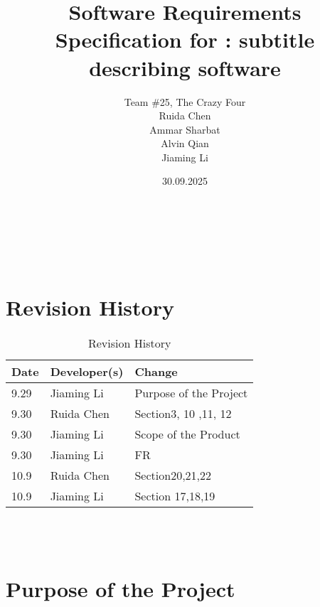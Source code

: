 \documentclass[12pt]{article}
\begin{document}
\title{Software Requirements Specification for \progname: subtitle describing software}
\author{
    Team \#25, The Crazy Four \\[1ex]
    Ruida Chen \\
    Ammar Sharbat \\
    Alvin Qian \\
    Jiaming Li
}
\date{30.09.2025}
    
\maketitle

~\newpage


\tableofcontents

~\newpage

\section*{Revision History}

\begin{table}[hp]
    \caption{Revision History} \label{TblRevisionHistory}
    \begin{tabularx}{\textwidth}{llX}
        \toprule
        \textbf{Date} & \textbf{Developer(s)} & \textbf{Change}\\
        \midrule
        9.29 & Jiaming Li & Purpose of the Project\\
        9.30 & Ruida Chen & Section3, 10 ,11,  12\\
        9.30 & Jiaming Li & Scope of the Product\\
        9.30 & Jiaming Li & FR\\
        10.9 & Ruida Chen & Section20,21,22\\
        10.9 & Jiaming Li & Section 17,18,19\\
        \bottomrule
    \end{tabularx}
\end{table}

~\\

~\newpage
\section{Purpose of the Project}
\end{document}
